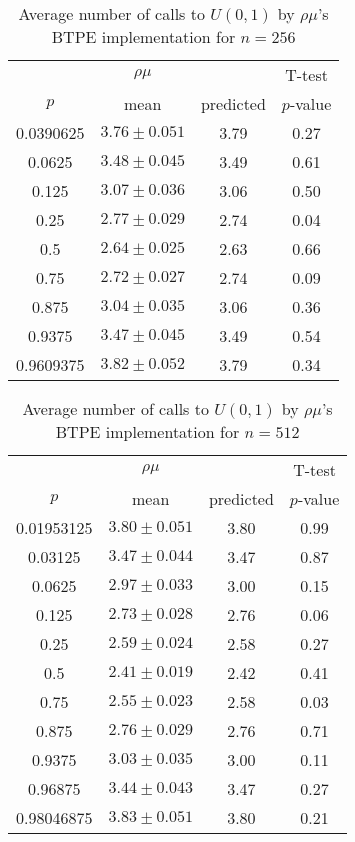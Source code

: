 \begin{table}[t]
\caption{Average number of calls to $U(0,1)$ by $\rho\mu$'s BTPE implementation for $n=256$}
\label{tab:calls256}
\begin{tabular}{cccc} \hline
    & $\rho\mu$ & & T-test \\
$p$ & mean & predicted & $p$-value \\ \hline
0.0390625    & $3.76 \pm 0.051$ & 3.79 & 0.27 \\
0.0625       & $3.48 \pm 0.045$ & 3.49 & 0.61 \\
0.125        & $3.07 \pm 0.036$ & 3.06 & 0.50 \\
0.25         & $2.77 \pm 0.029$ & 2.74 & 0.04 \\
0.5          & $2.64 \pm 0.025$ & 2.63 & 0.66 \\
0.75         & $2.72 \pm 0.027$ & 2.74 & 0.09 \\
0.875        & $3.04 \pm 0.035$ & 3.06 & 0.36 \\
0.9375       & $3.47 \pm 0.045$ & 3.49 & 0.54 \\
0.9609375    & $3.82 \pm 0.052$ & 3.79 & 0.34 \\
\hline
\end{tabular}
\end{table}

\begin{table}[t]
\caption{Average number of calls to $U(0,1)$ by $\rho\mu$'s BTPE implementation for $n=512$}
\label{tab:calls512}
\begin{tabular}{cccc} \hline
    & $\rho\mu$ & & T-test \\
$p$ & mean & predicted & $p$-value \\ \hline
0.01953125   & $3.80 \pm 0.051$ & 3.80 & 0.99 \\
0.03125      & $3.47 \pm 0.044$ & 3.47 & 0.87 \\
0.0625       & $2.97 \pm 0.033$ & 3.00 & 0.15 \\
0.125        & $2.73 \pm 0.028$ & 2.76 & 0.06 \\
0.25         & $2.59 \pm 0.024$ & 2.58 & 0.27 \\
0.5          & $2.41 \pm 0.019$ & 2.42 & 0.41 \\
0.75         & $2.55 \pm 0.023$ & 2.58 & 0.03 \\
0.875        & $2.76 \pm 0.029$ & 2.76 & 0.71 \\
0.9375       & $3.03 \pm 0.035$ & 3.00 & 0.11 \\
0.96875      & $3.44 \pm 0.043$ & 3.47 & 0.27 \\
0.98046875   & $3.83 \pm 0.051$ & 3.80 & 0.21 \\
\hline
\end{tabular}
\end{table}

